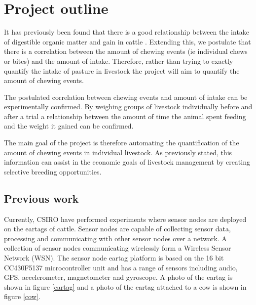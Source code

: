 \chapter{Project outline}
It has previously been found that there is a good relationship between the intake of digestible organic matter and gain in cattle \cite{Lippke1980}. Extending this, we postulate that there is a correlation between the amount of chewing events (ie individual chews or bites) and the amount of intake. Therefore, rather than trying to exactly quantify the intake of pasture in livestock the project will aim to quantify the amount of chewing events. 

The postulated correlation between chewing events and amount of intake can be experimentally confirmed. By weighing groups of livestock individually before and after a trial a relationship between the amount of time the animal spent feeding and the weight it gained can be confirmed. 

The main goal of the project is therefore automating the quantification of the amount of chewing events in individual livestock. As previously stated, this information can assist in the economic goals of livestock management by creating selective breeding opportunities. 

\section{Previous work}

Currently, CSIRO have performed experiments where sensor nodes are deployed on the eartags of cattle. Sensor nodes are capable of collecting sensor data, processing and communicating with other sensor nodes over a network. A collection of sensor nodes communicating wirelessly form a Wireless Sensor Network (WSN). The sensor node eartag platform is based on the 16 bit CC430F5137 microcontroller unit and has a range of sensors including audio, GPS, accelerometer, magnetometer and gyroscope. A photo of the eartag is shown in figure \ref{eartag} and a photo of the eartag attached to a cow is shown in figure \ref{cow}.


